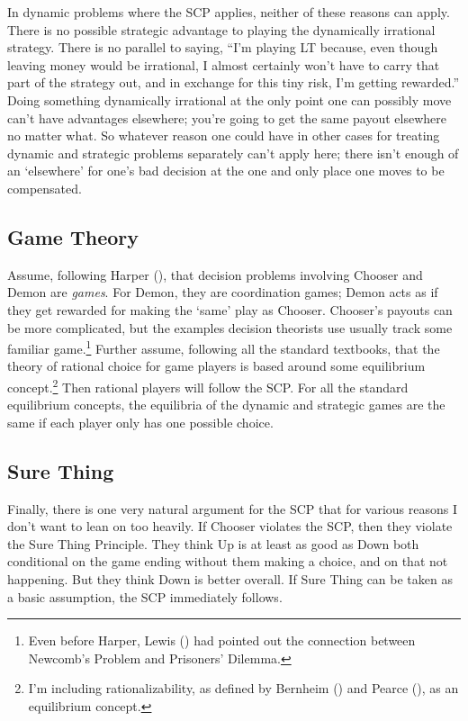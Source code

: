 \documentclass[
  10pt,
  letterpaper,
  DIV=11,
  numbers=noendperiod,
  twoside]{scrartcl}
\begin{document}
In dynamic problems where the SCP applies, neither of these reasons can
apply. There is no possible strategic advantage to playing the
dynamically irrational strategy. There is no parallel to saying, ``I'm
playing LT because, even though leaving money would be irrational, I
almost certainly won't have to carry that part of the strategy out, and
in exchange for this tiny risk, I'm getting rewarded.'' Doing something
dynamically irrational at the only point one can possibly move can't
have advantages elsewhere; you're going to get the same payout elsewhere
no matter what. So whatever reason one could have in other cases for
treating dynamic and strategic problems separately can't apply here;
there isn't enough of an `elsewhere' for one's bad decision at the one
and only place one moves to be compensated.

\subsection{Game Theory}\label{sec-game-theory}

Assume, following Harper (), that
decision problems involving Chooser and Demon are \emph{games}. For
Demon, they are coordination games; Demon acts as if they get rewarded
for making the `same' play as Chooser. Chooser's payouts can be more
complicated, but the examples decision theorists use usually track some
familiar game.\footnote{Even before Harper, Lewis
  () had pointed out the connection
  between Newcomb's Problem and Prisoners' Dilemma.} Further assume,
following all the standard textbooks, that the theory of rational choice
for game players is based around some equilibrium concept.\footnote{I'm
  including rationalizability, as defined by Bernheim
  () and Pearce
  (), as an equilibrium concept.} Then
rational players will follow the SCP. For all the standard equilibrium
concepts, the equilibria of the dynamic and strategic games are the same
if each player only has one possible choice.

\subsection{Sure Thing}\label{sec-surething}

Finally, there is one very natural argument for the SCP that for various
reasons I don't want to lean on too heavily. If Chooser violates the
SCP, then they violate the Sure Thing Principle. They think Up is at
least as good as Down both conditional on the game ending without them
making a choice, and on that not happening. But they think Down is
better overall. If Sure Thing can be taken as a basic assumption, the
SCP immediately follows.
\end{document}
